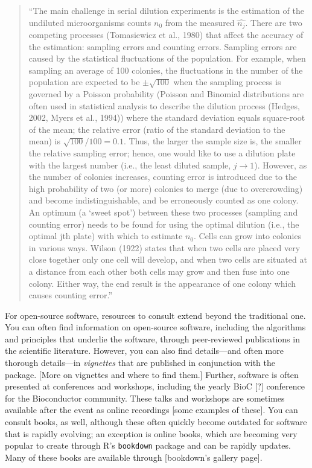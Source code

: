 \documentclass[]{tufte-book}
\begin{document}
\begin{quote}
``The main challenge in serial dilution experiments is the estimation of the
undiluted microorganisms counts \(n_0\) from the measured \(\hat{n_j}\). There are
two competing processes (Tomasiewicz et al., 1980) that affect the accuracy of
the estimation: sampling errors and counting errors. Sampling errors are caused
by the statistical fluctuations of the population. For example, when sampling an
average of 100 colonies, the fluctuations in the number of the population are
expected to be \(\pm \sqrt{100}\) when the sampling process is governed by a
Poisson probability (Poisson and Binomial distributions are often used in
statistical analysis to describe the dilution process (Hedges, 2002, Myers et
al., 1994)) where the standard deviation equals square-root of the mean; the
relative error (ratio of the standard deviation to the mean) is \(\sqrt{100} / 100 = 0.1\). Thus, the larger the sample size is, the smaller the relative
sampling error; hence, one would like to use a dilution plate with the largest
number (i.e., the least diluted sample, \(j \rightarrow 1\)). However, as the
number of colonies increases, counting error is introduced due to the high
probability of two (or more) colonies to merge (due to overcrowding) and become
indistinguishable, and be erroneously counted as one colony. An optimum (a
`sweet spot') between these two processes (sampling and counting error) needs to
be found for using the optimal dilution (i.e., the optimal jth plate) with
which to estimate \(n_0\). Cells can grow into colonies in various ways. Wilson
(1922) states that when two cells are placed very close together only one cell
will develop, and when two cells are situated at a distance from each other both
cells may grow and then fuse into one colony. Either way, the end result is the
appearance of one colony which causes counting error.'' \citep{ben2014estimation}
\end{quote}

For open-source software, resources to consult extend beyond the traditional
one. You can often find information on open-source software, including the
algorithms and principles that underlie the software, through peer-reviewed
publications in the scientific literature. However, you can also find
details---and often more thorough details---in \emph{vignettes} that are published in
conjunction with the package. {[}More on vignettes and where to find them.{]}
Further, software is often presented at conferences and workshops, including the
yearly BioC {[}?{]} conference for the Bioconductor community. These talks and
workshops are sometimes available after the event as online recordings {[}some
examples of these{]}. You can consult books, as well, although these often
quickly become outdated for software that is rapidly evolving; an exception
is online books, which are becoming very popular to create through R's
\texttt{bookdown} package and can be rapidly updates. Many of these books are
available through {[}bookdown's gallery page{]}.
\end{document}
